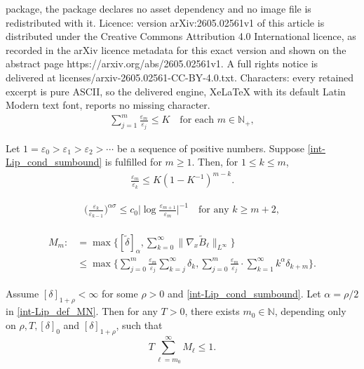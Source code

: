 \documentclass[10pt,a4paper]{amsart}
\newcommand{\N}{\mathbb{N}}
\begin{document}
package, the package declares no asset dependency and no image file is redistributed with it. Licence: version arXiv:2605.02561v1 of this article is distributed under the Creative Commons Attribution 4.0 International licence, as recorded in the arXiv licence metadata for this exact version and shown on the abstract page https://arxiv.org/abs/2605.02561v1. A full rights notice is delivered at licenses/arxiv-2605.02561-CC-BY-4.0.txt. Characters: every retained excerpt is pure ASCII, so the delivered engine, XeLaTeX with its default Latin Modern text font, reports no missing character.
\begin{align}
  \label{int-Lip_cond_sumbound}
  \sum_{j=1}^{m}\frac{\varepsilon_m}{\varepsilon_j}\leq K\quad \text{for each }m \in \N_+,
\end{align}

\begin{lemma}\label{int-Lip_lem_varepsilon}
  Let $1=\varepsilon_0> \varepsilon_1>\varepsilon_2>\cdots$ be a sequence of positive numbers. Suppose \eqref{int-Lip_cond_sumbound} is fulfilled for $m\geq 1$. Then, for $1\leq k\leq m$,
  \begin{align}\label{est.em/ek}
    \frac{\varepsilon_m}{\varepsilon_{k}}\leq K(1-K^{-1})^{m-k}.
  \end{align}
\end{lemma}

\begin{align}\label{cond_logseparation_m}
  \bigg(\frac{\varepsilon_k}{\varepsilon_{k-1}}\bigg)^{\alpha\sigma}\leq c_0\Big|\log \frac{\varepsilon_{m+1}}{\varepsilon_m}\Big|^{-1} \quad\text{for any } k\geq m+2,
\end{align}

\begin{align}\label{int-Lip_def_MN}
\begin{aligned}
  M_m: & = \max \Big\{ [\widetilde{\delta}]_\alpha, \sum_{k=0}^\infty \| \nabla_{x} \widetilde{B}_\ell \|_{L^\infty} \Big\} \\
  & \le \max\bigg\{\sum_{j=0}^{m}\frac{\varepsilon_m}{\varepsilon_j}\sum_{k=j}^{\infty}\delta_k, \sum_{j=0}^m\frac{\varepsilon_m}{\varepsilon_j}\cdot\sum_{k=1}^\infty k^\alpha\delta_{k+m}\bigg\}.
  \end{aligned}
\end{align}

\begin{lemma}\label{lem.sumMm}
    Assume $[\delta]_{1+\rho} < \infty$ for some $\rho>0$ and \eqref{int-Lip_cond_sumbound}. Let $\alpha = \rho/2$ in \eqref{int-Lip_def_MN}. Then for any $T > 0$, there exists $m_0 \in \N$, depending only on $\rho, T, [\delta]_0$ and $[\delta]_{1+\rho}$, such that
    \begin{equation*}
        T \sum_{\ell = m_0}^\infty M_\ell \le 1.
    \end{equation*}
\end{lemma}
\end{document}

